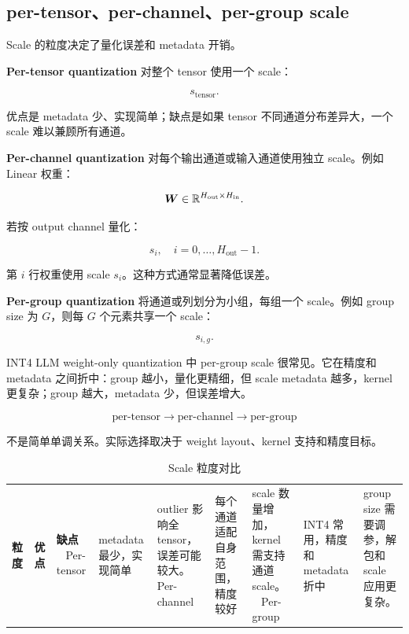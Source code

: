 \subsection{per-tensor、per-channel、per-group scale}
\label{subsec:per-tensor-channel-group-scale}

Scale 的粒度决定了量化误差和 metadata 开销。

\textbf{Per-tensor quantization} 对整个 tensor 使用一个 scale：

\[
s_{\mathrm{tensor}}.
\]

优点是 metadata 少、实现简单；缺点是如果 tensor 不同通道分布差异大，一个 scale 难以兼顾所有通道。

\textbf{Per-channel quantization} 对每个输出通道或输入通道使用独立 scale。例如 Linear 权重：

\[
\bm{W}\in\mathbb{R}^{H_{\mathrm{out}}\times H_{\mathrm{in}}}.
\]

若按 output channel 量化：

\[
s_i,\quad i=0,\ldots,H_{\mathrm{out}}-1.
\]

第 $i$ 行权重使用 scale $s_i$。这种方式通常显著降低误差。

\textbf{Per-group quantization} 将通道或列划分为小组，每组一个 scale。例如 group size 为 $G$，则每 $G$ 个元素共享一个 scale：

\[
s_{i,g}.
\]

INT4 LLM weight-only quantization 中 per-group scale 很常见。它在精度和 metadata 之间折中：group 越小，量化更精细，但 scale metadata 越多，kernel 更复杂；group 越大，metadata 少，但误差增大。

\[
\text{per-tensor}
\rightarrow
\text{per-channel}
\rightarrow
\text{per-group}
\]

不是简单单调关系。实际选择取决于 weight layout、kernel 支持和精度目标。

\begin{table}[H]
\centering
\small
\caption{Scale 粒度对比}
\label{tab:scale-granularity}
\begin{tabular}{p{}p{}p{}}
\toprule
\textbf{粒度} & \textbf{优点} & \textbf{缺点} \
\midrule
Per-tensor
& metadata 最少，实现简单
& outlier 影响全 tensor，误差可能较大。 \
\midrule
Per-channel
& 每个通道适配自身范围，精度较好
& scale 数量增加，kernel 需支持通道 scale。 \
\midrule
Per-group
& INT4 常用，精度和 metadata 折中
& group size 需要调参，解包和 scale 应用更复杂。 \
\bottomrule
\end{tabular}
\end{table}

